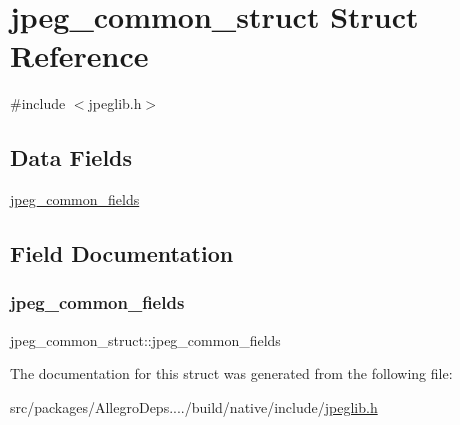 \hypertarget{structjpeg__common__struct}{}\section{jpeg\+\_\+common\+\_\+struct Struct Reference}
\label{structjpeg__common__struct}


{\ttfamily \#include $<$jpeglib.\+h$>$}

\subsection*{Data Fields}
\begin{DoxyCompactItemize}
\item 
\hyperlink{structjpeg__common__struct_af0328603f836658f65d39679f6bbfa7a}{jpeg\+\_\+common\+\_\+fields}
\end{DoxyCompactItemize}


\subsection{Field Documentation}
\mbox{\label{structjpeg__common__struct_af0328603f836658f65d39679f6bbfa7a}} 
\subsubsection{\texorpdfstring{jpeg\+\_\+common\+\_\+fields}{jpeg\_common\_fields}}
{\footnotesize\ttfamily jpeg\+\_\+common\+\_\+struct\+::jpeg\+\_\+common\+\_\+fields}



The documentation for this struct was generated from the following file\+:\begin{DoxyCompactItemize}
\item 
src/packages/\+Allegro\+Deps..../build/native/include/\hyperlink{jpeglib_8h}{jpeglib.\+h}\end{DoxyCompactItemize}

